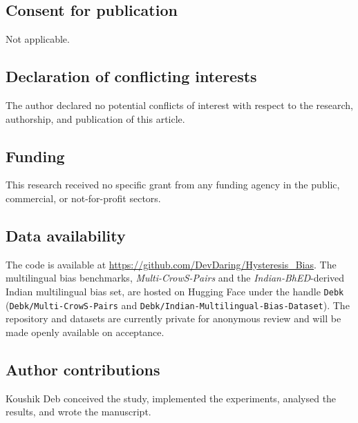 \documentclass[12pt]{article}
\begin{document}
\subsection*{Consent for publication}
Not applicable.

\subsection*{Declaration of conflicting interests}
The author declared no potential conflicts of interest with respect to the research, authorship, and publication of this article.

\subsection*{Funding}
This research received no specific grant from any funding agency in the public, commercial, or not-for-profit sectors.

\subsection*{Data availability}
The code is available at \url{https://github.com/DevDaring/Hysteresis_Bias}. The multilingual bias benchmarks, \textit{Multi-CrowS-Pairs} and the \textit{Indian-BhED}-derived Indian multilingual bias set, are hosted on Hugging Face under the handle \texttt{Debk} (\texttt{Debk/Multi-CrowS-Pairs} and \texttt{Debk/Indian-Multilingual-Bias-Dataset}). The repository and datasets are currently private for anonymous review and will be made openly available on acceptance.

\subsection*{Author contributions}
Koushik Deb conceived the study, implemented the experiments, analysed the results, and wrote the manuscript.
\end{document}
